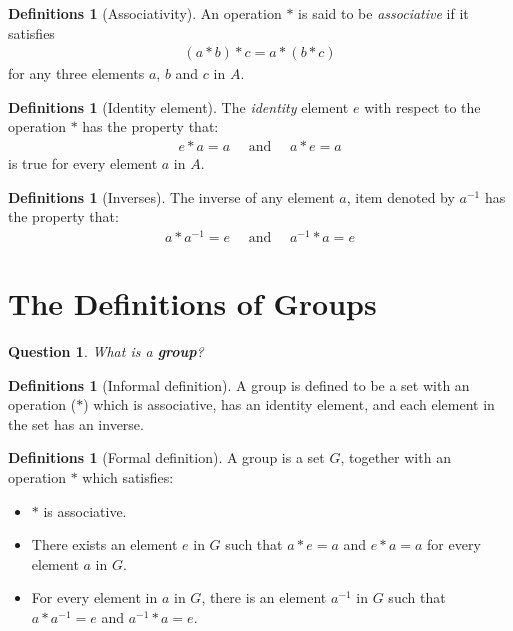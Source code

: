 \documentclass[nohyper,nobib]{tufte-handout}
\newtheorem{quest}[thm]{Question}
\theoremstyle{definition}
\newtheorem{defns}[thm]{Definitions}
\theoremstyle{remark}
\begin{document}
\begin{defns}[Associativity]
    An operation $*$ is said to be \emph{associative} if it satisfies 
        \begin{align}
            (a * b) * c = a * (b * c)
        \end{align}
        for any three elements $a$, $b$ and $c$ in $A$.
\end{defns}

\begin{defns}[Identity element]
    The \emph{identity} element $e$ with respect to the operation $*$ has the property that:
        \begin{align}
            e * a  = a \quad\text{ and }\quad a * e = a
        \end{align}
        is true for every element $a$ in $A$.
\end{defns}

\begin{defns}[Inverses]
    The inverse of any element $a$, item denoted by $a^{-1}$ has the property that:
        \begin{align}
            a * a^{-1} = e  \quad\text{ and }\quad a^{-1} * a = e
        \end{align}
\end{defns}

\section{The Definitions of Groups}

\begin{quest}
    What is a \textbf{group}?
\end{quest}

\begin{defns}[Informal definition]
    A group is defined to be a set with an operation ($*$) which is associative, has an identity element, and each element in the set has an inverse.
\end{defns}

\begin{defns}[Formal definition]
    A group is a set $G$, together with an operation $*$ which satisfies:

    \begin{itemize}
        \item $*$ is associative.
        \item There exists an element $e$ in $G$ such that $a*e = a$ and $e*a=a$ for every element $a$ in $G$.
        \item For every element in $a$ in $G$, there is an element $a^{-1}$ in $G$ such that $a * a^{-1} = e$ and $a^{-1} * a = e$.
    \end{itemize}
\end{defns}
\end{document}

